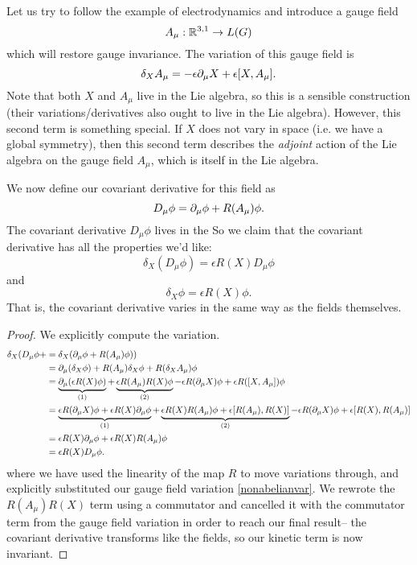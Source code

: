 Let us try to follow the example of electrodynamics and introduce a gauge field
$$A_\mu : \mathbb{R}^{3,1}\to L(G)$$
which will restore gauge invariance. The variation of this gauge field is
\begin{equation}\label{nonabelianvar}
\delta_X A_\mu = -\epsilon \partial_\mu X+\epsilon[X,A_\mu].
\end{equation}
Note that both $X$ and $A_\mu$ live in the Lie algebra, so this is a sensible construction (their variations/derivatives also ought to live in the Lie algebra). However, this second term is something special. If $X$ does not vary in space (i.e. we have a global symmetry), then this second term describes the \emph{adjoint} action of the Lie algebra on the gauge field $A_\mu$, which is itself in the Lie algebra.

We now define our covariant derivative for this field as
$$D_\mu \phi = \partial_\mu \phi+R(A_\mu)\phi.$$
The covariant derivative $D_\mu \phi$ lives in the %
So we claim that the covariant derivative has all the properties we'd like:
$$\delta_X(D_\mu \phi)=\epsilon R(X) D_\mu \phi$$
and $$\delta_X\phi = \epsilon R(X)\phi.$$
That is, the covariant derivative varies in the same way as the fields themselves.

\begin{proof}
We explicitly compute the variation.
\begin{align*}
    \delta_X(D_\mu \phi+&= \delta_X(\partial_\mu \phi+R(A_\mu)\phi))\\
    &=\partial_\mu (\delta_X \phi)+R(A_\mu)\delta_X \phi+ R(\delta_X A_\mu)\phi\\
    &= \underbrace{\partial_\mu (\epsilon R(X) \phi)}_{(1)}+\underbrace{\epsilon R(A_\mu)R(X) \phi}_{(2)} - \epsilon R(\partial_\mu X)\phi+\epsilon R([X,A_\mu])\phi\\
    &= \underbrace{\epsilon R(\partial_\mu X)\phi +\epsilon R(X) \partial_\mu \phi}_{(1)}+\underbrace{\epsilon R(X) R(A_\mu)\phi + \epsilon [R(A_\mu),R(X)]}_{(2)}-\epsilon R(\partial_\mu X)\phi +\epsilon [R(X),R(A_\mu)]\\
    &= \epsilon R(X) \partial_\mu \phi +\epsilon R(X) R(A_\mu)\phi\\
    &= \epsilon R(X) D_\mu\phi.
\end{align*}
where we have used the linearity of the map $R$ to move variations through, and explicitly substituted our gauge field variation \ref{nonabelianvar}. We rewrote the $R(A_\mu)R(X)$ term using a commutator and cancelled it with the commutator term from the gauge field variation in order to reach our final result-- the covariant derivative transforms like the fields, so our kinetic term is now invariant.
\end{proof}

